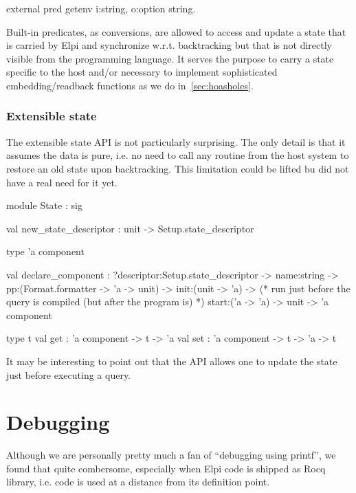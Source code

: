 \documentclass[a4paper, 11pt]{book}
\begin{document}
\begin{elpicode}
external pred getenv i:string, o:option string.
\end{elpicode}

Built-in predicates, as conversions, are allowed to access and update a state
that is carried by Elpi and synchronize w.r.t. backtracking but that is not
directly visible from the programming language. It serves the purpose
to carry a state specific to the host and/or necessary to implement
sophisticated embedding/readback functions as we do in~\cref{sec:hoasholes}.

\subsubsection{Extensible state}\label{sec:state}

The extensible state API is not particularly surprising. The only detail
is that it assumes the data is pure, i.e. no need to call any routine from
the host system to restore an old state upon backtracking. This limitation
could be lifted bu did not have a real need for it yet.

\begin{ocamlcode}
module State : sig

  val new_state_descriptor : unit -> Setup.state_descriptor

  type 'a component

  val declare_component :
    ?descriptor:Setup.state_descriptor ->
    name:string ->
    pp:(Format.formatter -> 'a -> unit) ->
    init:(unit -> 'a) ->
    (* run just before the query is compiled (but after the program is) *)
    start:('a -> 'a) ->
    unit ->
      'a component
  
  type t
  val get : 'a component -> t -> 'a
  val set : 'a component -> t -> 'a -> t
\end{ocamlcode}

\noindent
It may be interesting to point out that the API allows one to update the
state just before executing a query. 

\section{Debugging}\label{sec:trace}

Although we are personally pretty much a fan of ``debugging using printf'',
we found that quite combersome, especially when Elpi code is shipped as
Rocq library, i.e. code is used at a distance from its definition point.
\end{document}
